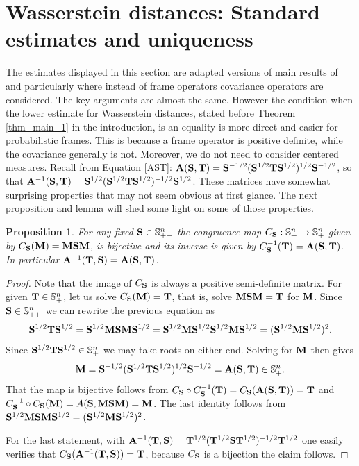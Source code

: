 \documentclass{amsart}
\numberwithin{equation}{section}
\newcommand\bA{{\bf A}}
\newcommand\bM{{\bf M}}
\newcommand\bS{{\bf S}}
\newcommand\bT{{\bf T}}
\theoremstyle{plain}
\newtheorem{proposition}[subsection]{Proposition}
\theoremstyle{definition}
\begin{document}
\section{Wasserstein distances: Standard estimates and uniqueness}
The estimates displayed in this section are adapted versions of main results of \cite{Gelbrich90} and particularly \cite{cuesta1996lower} 
where instead of frame operators covariance operators are considered. The key arguments are almost the same. 
However the condition when the lower estimate for Wasserstein distances, stated before Theorem \ref{thm_main_1} in the introduction,   
is an equality is more direct and easier for probabilistic frames. This is because a frame operator is positive definite, 
while the covariance generally is not. Moreover, we do not need to consider centered measures. Recall from Equation \ref{AST}: $\bA(\bS,\bT)=\bS^{-1/2}(\bS^{1/2} \bT \bS^{1/2})^{1/2}\bS^{-1/2}$, so that 
$\bA^{-1}(\bS,\bT)=\bS^{1/2}(\bS^{1/2} \bT \bS^{1/2})^{-1/2}\bS^{1/2}$. 
These matrices have somewhat surprising properties that may not seem obvious at first glance. The next proposition and lemma will 
shed some light on some of those properties.  
\begin{proposition}\label{prop_A_is_inverse}
For any fixed $\bS \in {\mathbb S}^n_{++}$ the congruence map $C_{\bS}:{\mathbb S}^n_{+} \rightarrow {\mathbb S}^n_{+}$ given by $C_{\bS}(\bM) = \bM\bS\bM$, is bijective and its inverse is given by $C^{-1}_{\bS}(\bT)=\bA(\bS, \bT)$. In particular $\bA^{-1}(\bT,\bS)=\bA(\bS,\bT)$.
\end{proposition}
\begin{proof}
Note that the image of $C_{\bS}$ is always a positive semi-definite matrix.  For given $\bT \in {\mathbb S}^n_{+}$, let us solve $C_{\bS}(\bM)=\bT$, that is, solve $\bM\bS\bM=\bT$ for $\bM$. Since $\bS \in {\mathbb S}^n_{++}$ we can rewrite the previous equation as 
$$\bS^{1/2}\bT \bS^{1/2}=\bS^{1/2}\bM\bS\bM\bS^{1/2}=\bS^{1/2}\bM\bS^{1/2}\bS^{1/2}\bM\bS^{1/2}=(\bS^{1/2}\bM\bS^{1/2})^2.$$ 
Since $\bS^{1/2}\bT \bS^{1/2} \in {\mathbb S}^n_{+}$ we may take roots on either end. Solving for $\bM$ then gives 
$$\bM=\bS^{-1/2}(\bS^{1/2}\bT \bS^{1/2})^{1/2}\bS^{-1/2} = \bA(\bS,\bT) \in {\mathbb S}^n_{+}.$$ 
That the map is bijective follows from $C_{\bS}\circ C^{-1}_{\bS}(\bT)=C_{\bS}(\bA(\bS,\bT))=\bT$ and $C^{-1}_{\bS}\circ C_{\bS}(\bM)=A(\bS, \bM \bS \bM)=\bM$.  
The last identity follows from $\bS^{1/2} \bM \bS \bM \bS^{1/2} =(\bS^{1/2} \bM \bS^{1/2})^2$. 

For the last statement, with $\bA^{-1}(\bT,\bS)=\bT^{1/2}(\bT^{1/2} \bS \bT^{1/2})^{-1/2}\bT^{1/2}$ one easily verifies that $C_{\bS}(\bA^{-1}(\bT,\bS))=\bT$, because $C_{\bS}$ is a bijection the claim follows. 
\end{proof}
\end{document}
